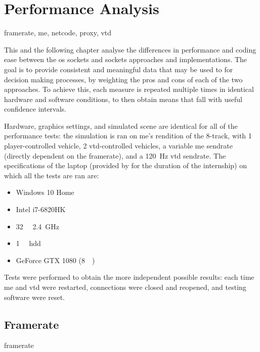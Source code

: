 \chapter{Performance Analysis}\label{ch:performance}

\begin{keywords}
	framerate, me, netcode, proxy, vtd
\end{keywords}

This and the following chapter analyse the differences in performance and coding ease between the \gls{os} sockets and  sockets approaches and implementations. The goal is to provide consistent and meaningful data that may be used to for decision making processes, by weighting the pros and cons of each of the two approaches. To achieve this, each measure is repeated multiple times in identical hardware and software conditions, to then obtain means that fall with useful confidence intervals.

Hardware, graphics settings, and simulated scene are identical for all of the performance tests: the simulation is ran on \gls{me}'s rendition of the 8-track, with \num{1} player-controlled vehicle, \num{2} \gls{vtd}-controlled vehicles, a variable \gls{me} \gls{sendrate} (directly dependent on the \gls{framerate}), and a \SI{120}{\hertz} \gls{vtd} \gls{sendrate}. The specifications of the  laptop (provided by  for the duration of the internship) on which all the tests are ran are:

\begin{itemize}
	\item Windows 10 Home
	\item Intel i7-6820HK
	\item \SI{32}{\giga\byte} \SI{2.4}{\giga\hertz}
	\item \SI{1}{\tera\byte} \acrshort{hdd}
	\item GeForce GTX 1080 (\SI{8}{\giga\byte})
\end{itemize}

Tests were performed to obtain the more independent possible results: each time \gls{me} and \gls{vtd} were restarted, connections were closed and reopened, and testing software were reset.

\section{Framerate}\label{sc:performance:framerate}

\begin{definition}{framerate}
\end{definition}


